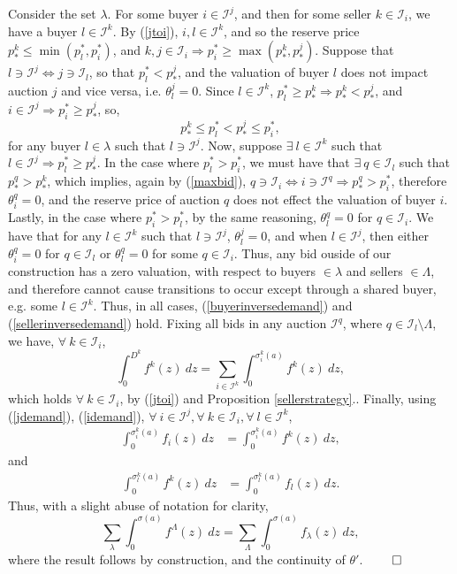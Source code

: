 \documentclass[sigconf, anonymous]{acmart}
\newcommand{\mcI}{\mathcal{I}}
\newcommand{\g}{\sigma}
\theoremstyle{definition}
\begin{document}
Consider the set $\lambda$. For some buyer $i\in\mcI^j$, and then for
some seller $k \in \mcI_i$, we have a buyer $l \in \mcI^k$. By (\ref{jtoi}), $i,l \in \mcI^k$, and so the reserve price $p_*^k \le \min(p_l^*,
p_i^*)$, and $k, j\in \mcI_i\Rightarrow p_i^* \ge \max(p_*^k, p_*^j)$.
Suppose that $l \ni \mcI^j\Leftrightarrow j \ni \mcI_l$, so
that $p_l^* < p_*^j$, and
the valuation of buyer $l$ does not impact auction $j$ and vice versa, i.e. $\theta_l^j = 0$. Since $l\in\mcI^k$, $p_l^* \ge p_*^k\Rightarrow
p_*^k < p_*^j$, and $i\in\mcI^j \Rightarrow p_i^* \ge p_*^j$, so,
$$
    p_*^k \le p_l^* < p_*^j \le p_i^*,
$$
for any buyer $l\in\lambda$ such that $l\ni \mcI^j$. Now, suppose $\exists \ l\in\mcI^k$ such that $l\in\mcI^j \Rightarrow p_l^* \ge
p_*^j$. In the case where $p_l^* > p_i^*$, we must have that 
$\exists \ q \in \mcI_l$ such that $p_*^q > p_*^k$, %
which implies, again by (\ref{maxbid}), $q\ni\mcI_i \Leftrightarrow i
\ni\mcI^q \Rightarrow p_*^q >
p_i^*$, therefore $\theta_i^q = 0$, and the reserve price of auction $q$ does not effect the valuation of
buyer $i$. 
Lastly, in the case where $p_i^* > p_l^*$, by the same reasoning, $\theta_l^q =
0$ for $q\in\mcI_i$.
We have that for any $l\in\mcI^k$ such that $l\ni
\mcI^j$, $\theta_l^j =0$, and when $l\in \mcI^j$, then either $\theta_i^q =0$
for $q\in\mcI_l$ or $\theta_l^q = 0$ for some $q\in\mcI_i$. Thus, any bid ouside of
our construction
has a zero valuation, with respect to buyers $\in\lambda$ and sellers
$\in\Lambda$, and therefore cannot cause transitions to occur except through a
shared buyer, e.g. some $l\in\mcI^k$. Thus, in all cases,
(\ref{buyerinversedemand}) and (\ref{sellerinversedemand}) hold. Fixing all
bids in any auction $\mcI^q$, where $q\in \mcI_l \setminus \Lambda$,
we have, $\forall \ k\in\mcI_i$,
\begin{equation}\label{idemand}
    \displaystyle\int_0^{D^k} f^k(z) \ dz = \sum_{i\in\mcI^k}\int_0^{\g_i^k(a)}
f^k(z) \ dz,
\end{equation}
which holds $\forall \ k\in\mcI_i$, by (\ref{jtoi}) and Proposition
\ref{sellerstrategy}..
Finally, using (\ref{jdemand}), (\ref{idemand}), $\forall \ i\in\mcI^j, \forall \ k\in\mcI_i,\forall \ l\in\mcI^k$,
\begin{align}\label{tieqtk}
    \int_0^{\g_i^k(a)} f_i(z) \ dz &= \int_0^{\g_i^k(a)} f^k(z) \ dz,
\end{align}
and
\begin{align}\label{tkeqtl}
    \int_0^{\g_l^k(a)} f^k(z) \ dz &= \int_0^{\g_l^k(a)} f_l(z) \ dz.
\end{align}
Thus, with a slight abuse of notation for clarity,
\begin{equation}\label{funion-eq}
    \sum_{\lambda}\int_0^{\g(a)} f^\Lambda(z) \ dz =
\sum_{\Lambda}\int_0^{\g(a)} f_\lambda(z) \ dz,
\end{equation}
where the result follows by construction, and the continuity of $\theta'$.
$\qed$
\end{document}
